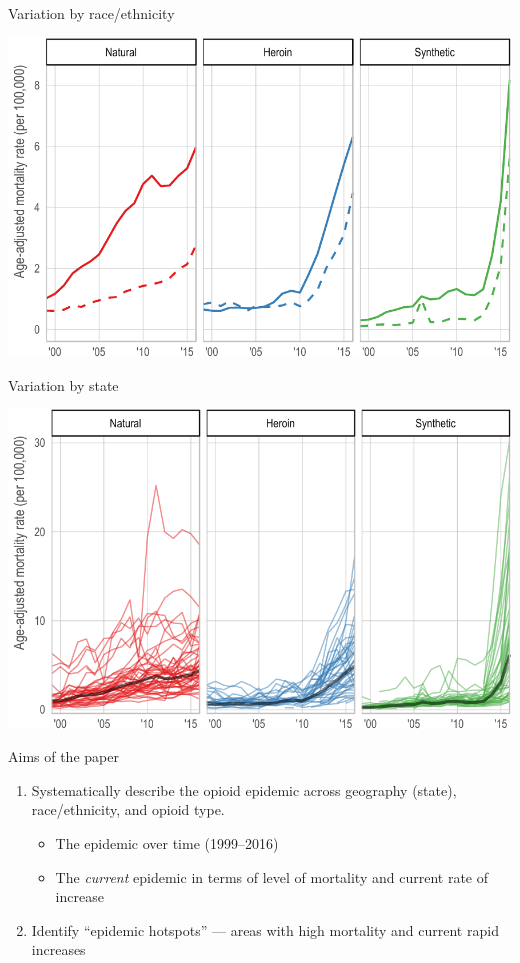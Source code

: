 \documentclass[ignorenonframetext,compress]{beamer}
\providecommand{\tightlist}{%
  \setlength{\itemsep}{0pt}\setlength{\parskip}{0pt}}
\begin{document}
\begin{frame}{Variation by race/ethnicity}

\includegraphics{epc_slides_files/figure-beamer/unnamed-chunk-4-1.pdf}

\end{frame}

\begin{frame}{Variation by state}

\includegraphics{epc_slides_files/figure-beamer/unnamed-chunk-5-1.pdf}

\end{frame}

\begin{frame}{Aims of the paper}

\begin{enumerate}
\def\labelenumi{\arabic{enumi}.}
\tightlist
\item
  Systematically describe the opioid epidemic across geography (state),
  race/ethnicity, and opioid type.

  \begin{itemize}
  \tightlist
  \item
    The epidemic over time (1999--2016)
  \item
    The \emph{current} epidemic in terms of level of mortality and
    current rate of increase
  \end{itemize}
\item
  Identify ``epidemic hotspots'' --- areas with high mortality and
  current rapid increases
\end{enumerate}

\end{frame}
\end{document}
